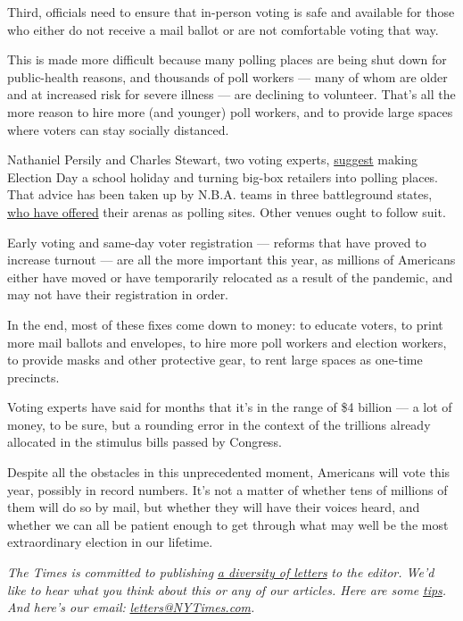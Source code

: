 Third, officials need to ensure that in-person voting is safe and
available for those who either do not receive a mail ballot or are not
comfortable voting that way.

This is made more difficult because many polling places are being shut
down for public-health reasons, and thousands of poll workers --- many
of whom are older and at increased risk for severe illness --- are
declining to volunteer. That's all the more reason to hire more (and
younger) poll workers, and to provide large spaces where voters can stay
socially distanced.

Nathaniel Persily and Charles Stewart, two voting experts,
\href{https://www.theatlantic.com/ideas/archive/2020/06/looming-threat-voting-person/613552/?utm_source=newsletter\&utm_medium=email\&utm_campaign=atlantic-daily-newsletter\&utm_content=20200701\&silverid-ref=NjEyOTYyMjM5Njg3S0}{suggest}
making Election Day a school holiday and turning big-box retailers into
polling places. That advice has been taken up by N.B.A. teams in three
battleground states,
\href{https://www.npr.org/2020/07/02/886566523/need-a-polling-place-with-social-distancing-3-nba-teams-offer-venues}{who
have offered} their arenas as polling sites. Other venues ought to
follow suit.

Early voting and same-day voter registration --- reforms that have
proved to increase turnout --- are all the more important this year, as
millions of Americans either have moved or have temporarily relocated as
a result of the pandemic, and may not have their registration in order.

In the end, most of these fixes come down to money: to educate voters,
to print more mail ballots and envelopes, to hire more poll workers and
election workers, to provide masks and other protective gear, to rent
large spaces as one-time precincts.

Voting experts have said for months that it's in the range of \$4
billion --- a lot of money, to be sure, but a rounding error in the
context of the trillions already allocated in the stimulus bills passed
by Congress.

Despite all the obstacles in this unprecedented moment, Americans will
vote this year, possibly in record numbers. It's not a matter of whether
tens of millions of them will do so by mail, but whether they will have
their voices heard, and whether we can all be patient enough to get
through what may well be the most extraordinary election in our
lifetime.

\emph{The Times is committed to publishing}
\href{https://www.nytimes3xbfgragh.onion/2019/01/31/opinion/letters/letters-to-editor-new-york-times-women.html}{\emph{a
diversity of letters}} \emph{to the editor. We'd like to hear what you
think about this or any of our articles. Here are some}
\href{https://help.nytimes3xbfgragh.onion/hc/en-us/articles/115014925288-How-to-submit-a-letter-to-the-editor}{\emph{tips}}\emph{.
And here's our email:}
\href{mailto:letters@NYTimes.com}{\emph{letters@NYTimes.com}}\emph{.}

